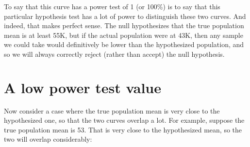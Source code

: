 \documentclass[../../../main.tex]{subfiles}
\begin{document}
\begin{center}
\end{center}

\noindent
To say that this curve has a power test of 1 (or 100\%) is to say that this particular hypothesis test has a lot of power to distinguish these two curves. And indeed, that makes perfect sense. The null hypothesizes that the true population mean is at least 55K, but if the actual population were at 43K, then any sample we could take would definitively be lower than the hypothesized population, and so we will always correctly reject (rather than accept) the null hypothesis.


\section{A low power test value}

Now consider a case where the true population mean is very close to the hypothesized one, so that the two curves overlap a lot. For example, suppose the true population mean is 53. That is very close to the hypothesized mean, so the two will overlap considerably:
\end{document}
